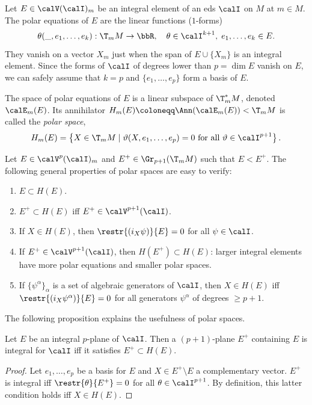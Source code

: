 \begin{defn}
    Let $E\in\calV(\calI)_m$ be an integral element of an \gls{eds} $\calI$ on $M$ at $m\in M$. The polar equations of $E$ are the linear functions ($1$-forms)
    \[ \theta(\_,e_1,\ldots,e_k): \T_mM\to \bbR,\quad \theta\in\calI^{k+1},\; e_1,\ldots,e_k\in E.\]
    They vanish on a vector $X_m$ just when the span of $E\cup \{X_m\}$ is an integral element. Since the forms of $\calI$ of degrees lower than $p=\dim E$ vanish on $E$, we can safely assume that $k=p$ and $\{e_1,\ldots,e_p\}$ form a basis of $E$. 
    
    The space of polar equations of $E$ is a linear subspace of $\T_m^\ast M$, denoted $\calE_m(E)$. Its annihilator $H_m(E)\coloneqq \Ann(\calE_m(E))<\T_mM$ is called the \emph{polar space},
    \[H_m(E)=\left\{X\in\T_m M\mid \vartheta(X,e_1,\ldots,e_p)=0\text{ for all }\vartheta\in\calI^{p+1}\right\}.\]
\end{defn}

Let $E\in\calV^p(\calI)_m$ and $E^+\in\Gr_{p+1}(\T_m M)$ such that $E<E^+$. The following general properties of polar spaces are easy to verify:
\begin{enumerate}
    \item $E\subset H(E)$.
    \item $E^+\subset H(E)$ iff $E^+\in \calV^{p+1}(\calI)$.
    \item If $X\in H(E)$, then $\restr{(i_X \psi)}{E}=0$ for all $\psi\in\calI$.
    \item If $E^+\in\calV^{p+1}(\calI)$, then $H(E^+)\subset H(E)$: larger integral elements have more polar equations and smaller polar spaces.
    \item If $\{\psi^\alpha\}_\alpha$ is a set of algebraic generators of $\calI$, then $X\in H(E)$ iff $\restr{(i_X\psi^\alpha)}{E}=0$ for all generators $\psi^\alpha$ of degrees $\geq p+1$.
\end{enumerate}

The following proposition explains the usefulness of polar spaces.

\begin{prop}
    Let $E$ be an integral $p$-plane of $\calI$. Then a $(p+1)$-plane $E^+$ containing $E$ is integral for $\calI$ iff it satisfies $E^+\subset H(E)$.
\end{prop}
\begin{proof}
    Let $e_1,\ldots,e_p$ be a basis for $E$ and $X\in E^+\setminus E$ a complementary vector. $E^+$ is integral iff $\restr{\theta}{E^+}=0$ for all $\theta\in\calI^{p+1}$. By definition, this latter condition holds iff $X\in H(E)$.
\end{proof}

